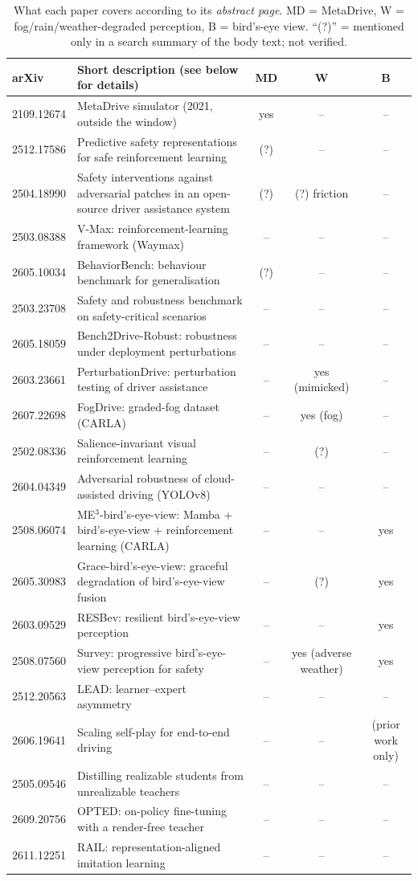 \begin{table}[H]\centering\small
\caption{What each paper covers according to its \emph{abstract page}. MD = MetaDrive, W = fog/rain/weather-degraded perception, B = bird's-eye view. ``(?)'' = mentioned only in a search summary of the body text; not verified.}\label{tab:related}
\begin{tabularx}{\textwidth}{@{}lXccc@{}}\toprule
arXiv & Short description (see below for details) & MD & W & B\\\midrule
2109.12674 & MetaDrive simulator (2021, outside the window) & yes & -- & --\\
2512.17586 & Predictive safety representations for safe reinforcement learning & (?) & -- & --\\
2504.18990 & Safety interventions against adversarial patches in an open-source driver assistance system & (?) & (?) friction & --\\
2503.08388 & V-Max: reinforcement-learning framework (Waymax) & -- & -- & --\\
2605.10034 & BehaviorBench: behaviour benchmark for generalisation & (?) & -- & --\\
2503.23708 & Safety and robustness benchmark on safety-critical scenarios & -- & -- & --\\
2605.18059 & Bench2Drive-Robust: robustness under deployment perturbations & -- & -- & --\\
2603.23661 & PerturbationDrive: perturbation testing of driver assistance & -- & yes (mimicked) & --\\
2607.22698 & FogDrive: graded-fog dataset (CARLA) & -- & yes (fog) & --\\
2502.08336 & Salience-invariant visual reinforcement learning & -- & (?) & --\\
2604.04349 & Adversarial robustness of cloud-assisted driving (YOLOv8) & -- & -- & --\\
2508.06074 & ME$^3$-bird's-eye-view: Mamba + bird's-eye-view + reinforcement learning (CARLA) & -- & -- & yes\\
2605.30983 & Grace-bird's-eye-view: graceful degradation of bird's-eye-view fusion & -- & (?) & yes\\
2603.09529 & RESBev: resilient bird's-eye-view perception & -- & -- & yes\\
2508.07560 & Survey: progressive bird's-eye-view perception for safety & -- & yes (adverse weather) & yes\\
2512.20563 & LEAD: learner--expert asymmetry & -- & -- & --\\
2606.19641 & Scaling self-play for end-to-end driving & -- & -- & (prior work only)\\
2505.09546 & Distilling realizable students from unrealizable teachers & -- & -- & --\\
2609.20756 & OPTED: on-policy fine-tuning with a render-free teacher & -- & -- & --\\
2611.12251 & RAIL: representation-aligned imitation learning & -- & -- & --\\\bottomrule
\end{tabularx}
\end{table}

